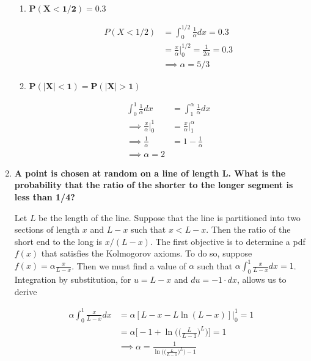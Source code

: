 \documentclass[10pt, oneside]{article}   	%
\theoremstyle{definition}
\begin{document}
\begin{enumerate}[label=4.\arabic*]
\begin{enumerate}
	\item  \begin{tcolorbox}[
	  colback=Cerulean!5!white,
	  colframe=Cerulean!75!black]
	\textbf{$\bm{P(X < 1/2) = 0.3}$}
	\end{tcolorbox}
	
	\begin{align*}
	P(X < 1/2) &= \int^{1/2}_{0} \frac{1}{\alpha} dx = 0.3 \\
	&= \frac{x}{\alpha} \Big|^{1/2}_{0} = \frac{1}{2\alpha} = 0.3 \\
	&\implies \boxed{\alpha = 5/3}
	\end{align*}
	
	\item  \begin{tcolorbox}[
	  colback=Cerulean!5!white,
	  colframe=Cerulean!75!black]
	\textbf{$\bm{P(|X| < 1) = P(|X| > 1)}$}
	\end{tcolorbox}
	
	\begin{align*}
	\int^1_0 \frac{1}{\alpha} dx &= \int^\alpha_1 \frac{1}{\alpha}dx \\
	\implies \frac{x}{\alpha} \Big|^1_0 &= \frac{x}{\alpha} \Big|^\alpha_1 \\
	\implies \frac{1}{\alpha} &= 1 - \frac{1}{\alpha} \\
	\implies \boxed{\alpha = 2}
	\end{align*}
	\end{enumerate}

\item  \begin{tcolorbox}[
  colback=Cerulean!5!white,
  colframe=Cerulean!75!black]
\textbf{A point is chosen at random on a line of length $\bm{L}$. What is the probability that the ratio of the shorter to the longer segment is less than 1/4?}
\end{tcolorbox}

Let $L$ be the length of the line. Suppose that the line is partitioned into two sections of length $x$ and $L-x$ such that $x < L-x$. Then the ratio of the short end to the long is $x / (L-x)$. The first objective is to determine a pdf $f(x)$ that satisfies the Kolmogorov axioms. To do so, suppose $f(x) = \alpha \frac{x}{L-x}$. Then we must find a value of $\alpha$ such that $\alpha \int^1_0 \frac{x}{L-x}dx = 1$. Integration by substitution, for $u = L-x$ and $du = -1 \cdot dx$, allows us to derive

\begin{align*}
\alpha \int^1_0 \frac{x}{L-x}dx &= \alpha [L - x - L \ln (L-x)] \Big|^1_0 = 1 \\
&= \alpha \Bigg[ -1 + \ln \Bigg( \Bigg( \frac{L}{L-1} \Bigg)^L \Bigg) \Bigg] = 1 \\
&\implies \boxed{\alpha = \frac{1}{\ln \Big( \Big( \frac{L}{L-1} \Big)^L \Big) - 1}}
\end{align*}


\end{enumerate}
\end{document}
